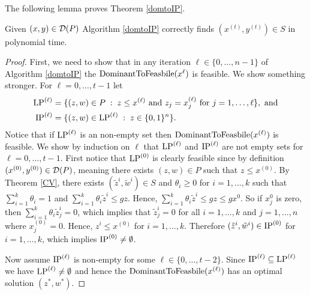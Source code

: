 \documentclass[runningheads]{llncs}
\begin{document}
The following lemma proves Theorem \ref{domtoIP}.
\begin{lemma}
	Given $(x,y)\in \operatorname{\mathcal{D}}(P)$ Algorithm \ref{domtoIP} correctly finds $(x^{(t)},y^{(t)})\in S$ in polynomial time.
\end{lemma}
\begin{proof}
	First, we need to show that in any iteration $\ell\in \{0,\ldots,n-1\}$ of Algorithm \ref{domtoIP} the $\operatorname{DominantToFeasbile}(x^{\ell})$ is feasible. We show something stronger. For $\ell=0,\ldots,t-1$ let
	\begin{align*}
		\operatorname{LP}^{(\ell)}&= \{(z,w)\in P\; : \; z\leq x^{(\ell)} \mbox{ and } z_j=x_j^{(\ell)} \mbox{ for } j=1,\ldots,\ell\}, \text{ and}\\
		\operatorname{IP}^{(\ell)}&= \{(z,w)\in \operatorname{LP}^{(\ell)}\; : \; z\in \{0,1\}^n\}.
	\end{align*}
	Notice that if $\operatorname{LP}^{(\ell)}$ is an non-empty set then $\operatorname{DominantToFeasbile}(x^{(\ell)})$ is feasible. We show by induction on $\ell$ that $\operatorname{LP}^{(\ell)}$ and $\operatorname{IP}^{(\ell)}$ are not empty sets for $\ell=0,\ldots,t-1$. First notice that $\operatorname{LP}^{(0)}$ is clearly feasible since by definition $(x^{(0)},y^{(0)})\in \operatorname{\mathcal{D}}(P)$, meaning there exists $(z,w)\in P$ such that $z\leq x^{(0)}$. By Theorem \ref{CV}, there exists $(\tilde{z}^i,\tilde{w}^i) \in S$ and $\theta_i\geq 0$ for $i=1,\ldots,k$ such that $\sum_{i=1}^{k} \theta_i = 1$ and $\sum_{i=1}^{k}\theta_i \tilde{z}^i \leq gz$. Hence, $\sum_{i=1}^{k}\theta_i \tilde{z}^i \leq gz\leq gx^0$. So if $x^0_j$ is zero, then $ \sum_{i=1}^{k}\theta_i \tilde{z}_j^i =0$, which implies that $\tilde{z}^i_j=0$ for all $i=1,\ldots,k$ and $j= 1,\ldots,n$ where $x^{(0)}_j=0$. Hence, $z^i\leq x^{(0)}$ for $i=1,\ldots,k$. Therefore $(\tilde{z}^i,\tilde{w}^i)\in \operatorname{IP}^{(0)}$ for $i=1,\ldots,k$, which implies $\operatorname{IP}^{(0)}\neq \emptyset$.
	
	Now assume $\operatorname{IP}^{(\ell)}$ is non-empty for some $\ell \in \{0,\ldots,t-2\}$. Since $\operatorname{IP}^{(\ell)}\subseteq\operatorname{LP}^{(\ell)}$ we have $\operatorname{LP}^{(\ell)}\neq \emptyset$ and hence the $\operatorname{DominantToFeasbile}(x^{(\ell)})$ has an optimal solution $(z^*,w^*)$. 
	

\end{proof}
\end{document}
